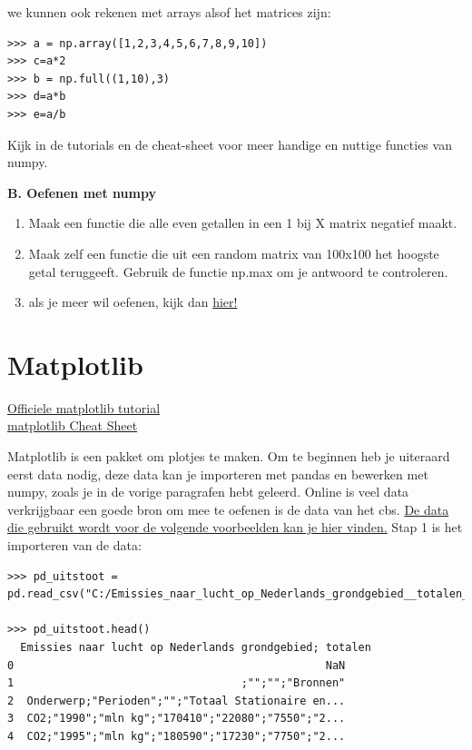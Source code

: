 we kunnen ook rekenen met arrays alsof het matrices zijn:
\begin{lstlisting}[frame=single]
>>> a = np.array([1,2,3,4,5,6,7,8,9,10])
>>> c=a*2
>>> b = np.full((1,10),3)
>>> d=a*b
>>> e=a/b
\end{lstlisting}

Kijk in de tutorials en de cheat-sheet voor meer handige en nuttige functies van numpy.

\textbf{B. Oefenen met numpy}
\begin{enumerate}[label=\textbf{B.\arabic*}]
\item Maak een functie die alle even getallen in een 1 bij X matrix negatief maakt.
\item Maak zelf een functie die uit een random matrix van 100x100 het hoogste getal teruggeeft. Gebruik de functie np.max om je antwoord te controleren.
\item als je meer wil oefenen, kijk dan \href{https://www.machinelearningplus.com/python/101-numpy-exercises-python/}{hier!}
\end{enumerate}

\section{Matplotlib}
\href{https://matplotlib.org/users/pyplot_tutorial.html}{Officiele matplotlib tutorial}\\
\href{https://s3.amazonaws.com/assets.datacamp.com/blog_assets/Python_Matplotlib_Cheat_Sheet.pdf}{matplotlib Cheat Sheet}

Matplotlib is een pakket om plotjes te maken. Om te beginnen heb je uiteraard eerst data nodig, deze data kan je importeren met pandas en bewerken met numpy, zoals je in de vorige paragrafen hebt geleerd.
Online is veel data verkrijgbaar een goede bron om mee te oefenen is de data van het cbs. 
\href{https://opendata.cbs.nl/#/CBS/nl/dataset/37221/table?dl=14447}{De data die gebruikt wordt voor de volgende voorbeelden kan je hier vinden.}
Stap 1 is het importeren van de data:

\begin{lstlisting}[frame=single]
>>> pd_uitstoot = pd.read_csv("C:/Emissies_naar_lucht_op_Nederlands_grondgebied__totalen_11112018_170037.csv")

>>> pd_uitstoot.head()
  Emissies naar lucht op Nederlands grondgebied; totalen
0                                                NaN    
1                                   ;"";"";"Bronnen"    
2  Onderwerp;"Perioden";"";"Totaal Stationaire en...    
3  CO2;"1990";"mln kg";"170410";"22080";"7550";"2...    
4  CO2;"1995";"mln kg";"180590";"17230";"7750";"2... 
\end{lstlisting}


